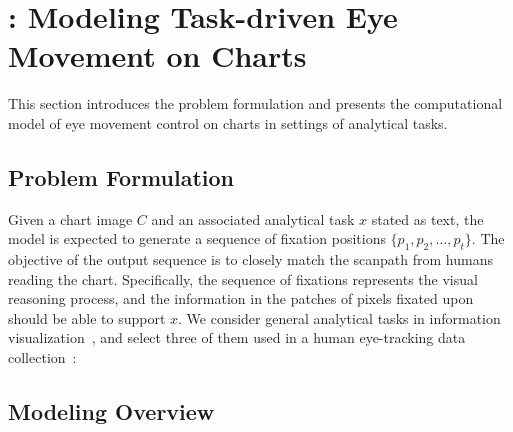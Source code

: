 \section{\name: Modeling Task-driven Eye Movement on Charts}
\label{sec:model}

This section introduces the problem formulation and presents the computational model of eye movement control on charts in settings of analytical tasks.

\subsection{Problem Formulation}

Given a chart image $C$ and an associated analytical task $x$ stated as text, the model is expected to generate a sequence of fixation positions $\{ p_1, p_2, \dots , p_t\}$.
The objective of the output sequence is to closely match the scanpath from humans reading the chart. 
Specifically, the sequence of fixations represents the visual reasoning process, and the information in the patches of pixels fixated upon should be able to support $x$.
We consider general analytical tasks in information visualization~\cite{amar2005low}, and
select three of them used in a human eye-tracking data collection~\cite{polatsek2018exploring}: %

\subsection{Modeling Overview}

